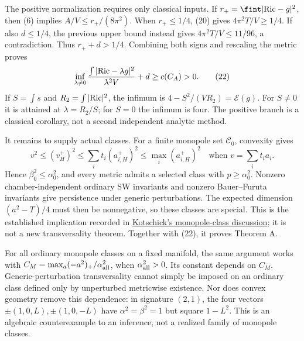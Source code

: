 \documentclass[
  english,
]{article}
\begin{document}
The positive normalization requires only classical inputs. If
\(r_+=\fint|{\rm Ric}-g|^2\), then (6) implies \(A/V\le r_+/(8\pi^2)\).
When \(r_+\le1/4\), (20) gives \(4\pi^2T/V\ge1/4\). If also \(d\le1/4\),
the previous upper bound instead gives \(4\pi^2T/V\le11/96\), a
contradiction. Thus \(r_++d>1/4\). Combining both signs and rescaling
the metric proves \[
 \inf_{\lambda\ne0}
      \frac{\int|{\rm Ric}-\lambda g|^2}{\lambda^2V}+d
                                                        \ge c(C_A)>0.
                                                               \tag{22}
\] If \(S=\int s\) and \(R_2=\int|{\rm Ric}|^2\), the infimum is
\(4-S^2/(VR_2)=\mathcal E(g)\). For \(S\ne0\) it is attained at
\(\lambda=R_2/S\); for \(S=0\) the infimum is four. The positive branch
is a classical corollary, not a second independent analytic method.

It remains to supply actual classes. For a finite monopole set
\(\mathcal C_0\), convexity gives \[
 v^2\le(v_H^+)^2\le
       \sum_i t_i(a_{i,H}^+)^2\le\max_i(a_{i,H}^+)^2
       \quad\text{when }v=\sum_i t_i a_i.
\] Hence \(\beta_0^2\le\alpha_0^2\), and every metric admits a selected
class with \(p\ge\alpha_0^2\). Nonzero chamber-independent ordinary SW
invariants and nonzero Bauer--Furuta invariants give persistence under
generic perturbations. The expected dimension \((a^2-T)/4\) must then be
nonnegative, so these classes are special. This is the established
implication recorded in
\href{https://arxiv.org/abs/math/0306022}{Kotschick's monopole-class
discussion}; it is not a new transversality theorem. Together with (22),
it proves Theorem A.

For all ordinary monopole classes on a fixed manifold, the same argument
works with \(C_M=\max_a(-a^2)_+/\alpha_{\rm all}^2\), when
\(\alpha_{\rm all}^2>0\). Its constant depends on \(C_M\).
Generic-perturbation transversality cannot simply be imposed on an
ordinary class defined only by unperturbed metricwise existence. Nor
does convex geometry remove this dependence: in signature \((2,1)\), the
four vectors \(\pm(1,0,L),\pm(1,0,-L)\) have \(\alpha^2=\beta^2=1\) but
square \(1-L^2\). This is an algebraic counterexample to an inference,
not a realized family of monopole classes.
\end{document}
